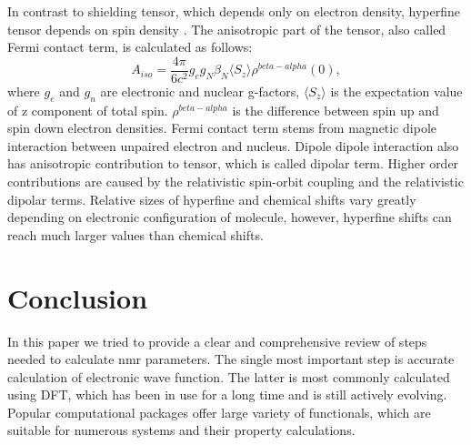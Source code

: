 \documentclass[openany, longbibliography,slovene,a4paper,12pt]{article}
\begin{document}
  In contrast to shielding tensor, which depends only on electron density,
  hyperfine tensor depends on spin density \cite{calcul_hyper_tensor_param_nmr}.
  The anisotropic part of the tensor, also called Fermi contact term, is
  calculated as follows:
  \begin{equation}
    A_{iso}=\frac{4\pi}{6c^2}g_eg_N\beta_N\langle S_z \rangle \rho^{beta-alpha}(0),
    \end{equation}
where $g_e$ and $g_n$ are electronic and nuclear g-factors, $\langle S_z
\rangle$ is the expectation value of z component of total spin.  $\rho^{beta-alpha}$ is the difference between spin up and spin
down electron densities. Fermi contact term stems from magnetic dipole
interaction between unpaired electron and nucleus. Dipole dipole interaction
also has anisotropic contribution to tensor, which is called dipolar term. Higher
order contributions are caused by the relativistic spin-orbit coupling and
the relativistic dipolar terms.
Relative sizes of hyperfine and chemical shifts vary greatly depending on
electronic configuration of molecule, however,
hyperfine shifts can reach much larger values than chemical shifts. 

\section{Conclusion}
In this paper we tried to provide a clear and comprehensive review of steps needed
to calculate nmr parameters. The single most important step is accurate
calculation of electronic wave function. The latter is most commonly calculated
using DFT, which has been in use for a long time and is still actively evolving.
Popular computational packages offer large variety of functionals, which are
suitable for numerous systems and their property calculations. 

\newpage {}




\end{document}
